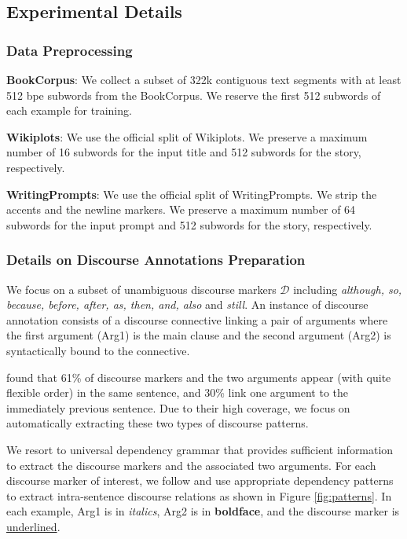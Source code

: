 \documentclass[11pt]{article}
\begin{document}
\subsection{Experimental Details}

\subsubsection{Data Preprocessing}\label{sec:data_proc}

\noindent\textbf{BookCorpus}: We collect a subset of 322k contiguous text segments with at least 512 bpe subwords from the BookCorpus. We reserve the first 512 subwords of each example for training.

\noindent\textbf{Wikiplots}: We use the official split of Wikiplots. We preserve a maximum number of 16 subwords for the input title and 512 subwords for the story, respectively.

\noindent\textbf{WritingPrompts}: We use the official split of WritingPrompts. We strip the accents and the newline markers. We preserve a maximum number of 64 subwords for the input prompt and 512 subwords for the story, respectively.

\subsubsection{Details on Discourse Annotations Preparation}\label{sec:annotation}

We focus on a subset of unambiguous discourse markers $\mathcal{D}$ including \textit{although, so, because, before, after, as, then, and, also} and \textit{still}. An instance of discourse annotation consists of a discourse connective linking a pair of arguments where the first argument (Arg1) is the main clause and the second argument (Arg2) is syntactically bound to the connective.

\citet{pdtb2} found that 61\% of discourse markers and the two arguments appear (with quite flexible order) in the same sentence, and 30\% link one argument to the immediately previous sentence. Due to their high coverage, we focus on automatically extracting these two types of discourse patterns.

We resort to universal dependency grammar that provides sufficient information to extract the discourse markers and the associated two arguments. For each discourse marker of interest, we follow \citet{DisSent} and use appropriate dependency patterns to extract intra-sentence discourse relations as shown in Figure \ref{fig:patterns}. In each example, Arg1 is in \textit{italics}, Arg2 is in \textbf{boldface}, and the discourse marker is \underline{underlined}.
\end{document}
